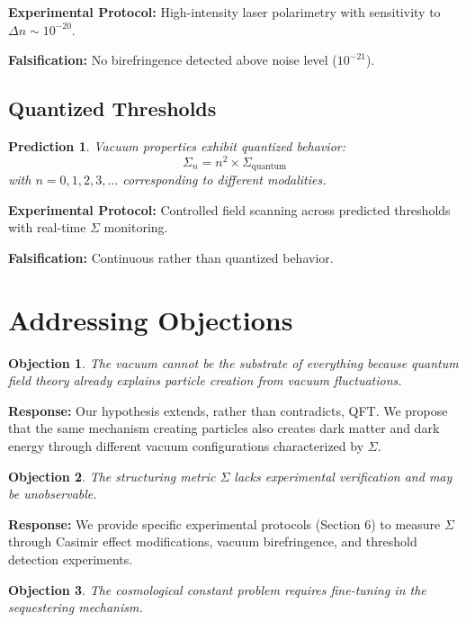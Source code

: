 \documentclass[12pt,a4paper]{article}
\newcommand{\structuring}{\Sigma}
\newtheorem{prediction}{Prediction}
\newtheorem{objection}{Objection}
\begin{document}
\textbf{Experimental Protocol:} High-intensity laser polarimetry with sensitivity to $\Delta n \sim 10^{-20}$.

\textbf{Falsification:} No birefringence detected above noise level ($10^{-21}$).

\subsection{Quantized Thresholds}

\begin{prediction}
Vacuum properties exhibit quantized behavior:
\begin{equation}
\structuring_n = n^2 \times \structuring_{\text{quantum}}
\end{equation}
with $n = 0, 1, 2, 3, \ldots$ corresponding to different modalities.
\end{prediction}

\textbf{Experimental Protocol:} Controlled field scanning across predicted thresholds with real-time $\structuring$ monitoring.

\textbf{Falsification:} Continuous rather than quantized behavior.

\section{Addressing Objections}

\begin{objection}
The vacuum cannot be the substrate of everything because quantum field theory already explains particle creation from vacuum fluctuations.
\end{objection}

\textbf{Response:} Our hypothesis extends, rather than contradicts, QFT. We propose that the same mechanism creating particles also creates dark matter and dark energy through different vacuum configurations characterized by $\structuring$.

\begin{objection}
The structuring metric $\structuring$ lacks experimental verification and may be unobservable.
\end{objection}

\textbf{Response:} We provide specific experimental protocols (Section 6) to measure $\structuring$ through Casimir effect modifications, vacuum birefringence, and threshold detection experiments.

\begin{objection}
The cosmological constant problem requires fine-tuning in the sequestering mechanism.
\end{objection}
\end{document}
